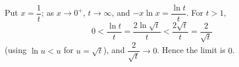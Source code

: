 Put $x=\dfrac1t$; as $x\to0^+$, $t\to\infty$, and $-x\ln x=\dfrac{\ln t}{t}$. For $t>1$,
\[0<\dfrac{\ln t}{t}=\dfrac{2\ln\sqrt t}{t}<\dfrac{2\sqrt t}{t}=\dfrac{2}{\sqrt t}\]
(using $\ln u<u$ for $u=\sqrt t$), and $\dfrac2{\sqrt t}\to0$. Hence the limit is $\boxed{0}$.
